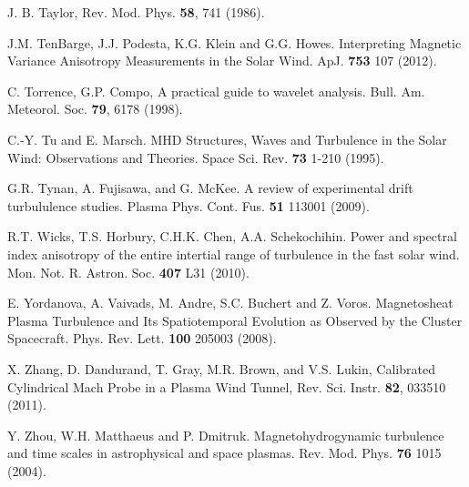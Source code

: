 \documentclass[preprint2]{aastex}
\begin{document}
\begin{thebibliography}{}
 J. B. Taylor, Rev. Mod. Phys. {\bf 58}, 741 (1986).

 J.M. TenBarge, J.J. Podesta, K.G. Klein and G.G. Howes. Interpreting Magnetic Variance Anisotropy Measurements in the Solar Wind. ApJ. {\bf 753} 107 (2012).

C. Torrence, G.P. Compo, A practical guide to wavelet analysis. Bull. Am. Meteorol. Soc. {\bf 79}, 6178 (1998).

 C.-Y. Tu and E. Marsch. MHD Structures, Waves and Turbulence in the Solar Wind: Observations and Theories. Space Sci. Rev. {\bf 73} 1-210 (1995).

 G.R. Tynan, A. Fujisawa, and G. McKee. A review of experimental drift turbululence studies. Plasma Phys. Cont. Fus. {\bf 51} 113001 (2009).

 R.T. Wicks, T.S. Horbury, C.H.K. Chen, A.A. Schekochihin. Power and spectral index anisotropy of the entire intertial range of turbulence in the fast solar wind. Mon. Not. R. Astron. Soc. {\bf 407} L31 (2010).

 E. Yordanova, A. Vaivads, M. Andre, S.C. Buchert and Z. Voros. Magnetosheat Plasma Turbulence and Its Spatiotemporal Evolution as Observed by the Cluster Spacecraft. Phys. Rev. Lett. {\bf 100} 205003 (2008).

 X. Zhang, D. Dandurand, T. Gray, M.R. Brown, and V.S. Lukin, Calibrated Cylindrical Mach Probe in a Plasma Wind Tunnel, Rev. Sci. Instr. {\bf 82}, 033510 (2011).

 Y. Zhou, W.H. Matthaeus and P. Dmitruk. Magnetohydrogynamic turbulence and time scales in astrophysical and space plasmas. Rev. Mod. Phys. {\bf 76} 1015 (2004).

\end{thebibliography}
\end{document}
